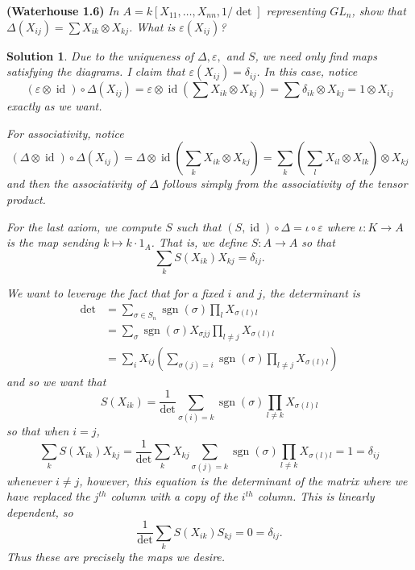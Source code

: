 \documentclass[12pt]{article}
\theoremstyle{nonumberbreak}
\newtheorem{sol}{Solution}
\theoremstyle{changebreak}
\theoremstyle{nonumberplain}
\theoremstyle{change}
\newenvironment{wprob}[1]{\begin{prob}{\normalfont\bfseries (Waterhouse #1) }\itshape}{\end{prob}}
\begin{document}
\begin{wprob}{1.6}
	In $A=k[X_{11},\dots,X_{nn},1/\operatorname{det}]$ representing $GL_n$, show that $\Delta(X_{ij})=\sum X_{ik}\otimes X_{kj}$.
	What is $\varepsilon(X_{ij})$?
\end{wprob}
\begin{sol}
	Due to the uniqueness of $\Delta,\varepsilon,$ and $S$, we need only find maps satisfying 
	the diagrams. I claim that $\varepsilon(X_{ij})=\delta_{ij}$. In this case, notice
	\[(\varepsilon\otimes\operatorname{id})\circ\Delta(X_{ij})=\varepsilon\otimes\operatorname{id}\left( \sum X_{ik}\otimes X_{kj} \right)=\sum \delta_{ik}\otimes X_{kj}=1\otimes X_{ij}\]
	exactly as we want.

	For associativity, notice
	\[(\Delta\otimes \operatorname{id})\circ \Delta (X_{ij})=\Delta\otimes\operatorname{id}\left( \sum_k X_{ik}\otimes X_{kj} \right)=\sum_k\left(\sum_l X_{il}\otimes X_{lk}\right)\otimes X_{kj}\]
	and then the associativity of $\Delta$ follows simply from the associativity of the tensor product.

	For the last axiom, we compute $S$ such that $(S,\operatorname{id})\circ\Delta=\iota\circ\varepsilon$ where $\iota:K\to A$ is the map sending $k\mapsto k\cdot 1_A$.
	That is, we define $S:A\to A$ so that
	\[\sum_k S(X_{ik})X_{kj}=\delta_{ij}.\]

	We want to leverage the fact that for a fixed $i$ and $j$, the determinant is
	\begin{align*}
		\operatorname{det} &= \sum_{\sigma\in S_n}\operatorname{sgn}(\sigma)\prod_l X_{\sigma(l)l}\\
		&=\sum_\sigma \operatorname{sgn}(\sigma)X_{\sigma{j}j}\prod_{l\ne j} X_{\sigma(l)l}\\
		&=\sum_i X_{ij}\left(\sum_{\sigma(j)=i}\operatorname{sgn}(\sigma)\prod_{l\ne j}X_{\sigma(l)l}\right)
	\end{align*}
	and so we want that 
	\[S(X_{ik})=\frac{1}{\operatorname{det}}\sum_{\sigma(i)=k}\operatorname{sgn}(\sigma)\prod_{l\ne k}X_{\sigma(l)l}\]
	so that when $i=j$,
	\[\sum_k S(X_{ik})X_{kj}=\frac{1}{\operatorname{det}}\sum_k X_{kj}\sum_{\sigma(j)=k}\operatorname{sgn}(\sigma)\prod_{l\ne k}X_{\sigma(l)l}=1=\delta_{ij}\]
	whenever $i\ne j$, however, this equation is the determinant of the matrix where we have replaced
	the $j^{th}$ column with a copy of the $i^{th}$ column. This is linearly dependent, so 
	\[\frac{1}{\operatorname{det}}\sum_k S(X_{ik})S_{kj}=0=\delta_{ij}.\]
	Thus these are precisely the maps we desire.
\end{sol}
\end{document}
